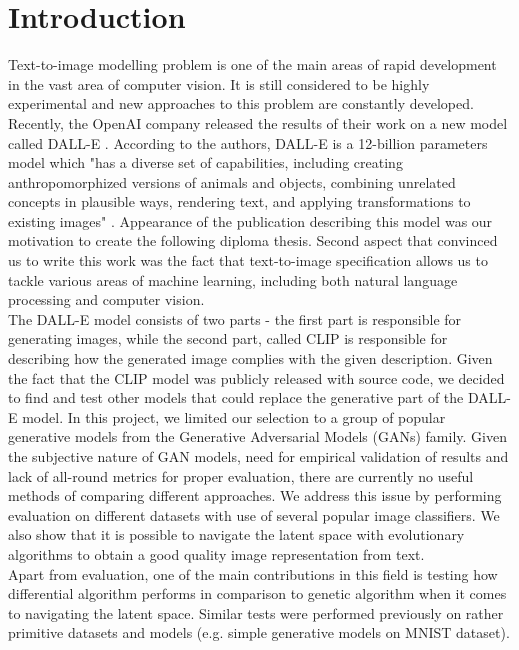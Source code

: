 \documentclass[12pt,a4paper,openany]{book}
\begin{document}


\tableofcontents

\chapter*{Introduction}

\noindent Text-to-image modelling problem is one of the main areas of rapid development in the vast area of computer vision.  It is still considered to be highly experimental and new approaches to this problem are constantly developed. Recently, the OpenAI company released the results of their work on a new model called DALL-E \cite{dalle}.  According to the authors,  DALL-E is a 12-billion parameters model which "has a diverse set of capabilities, including creating anthropomorphized versions of animals and objects, combining unrelated concepts in plausible ways, rendering text, and applying transformations to existing images" \cite{dalle-blog}.  Appearance of the publication describing this model was our motivation to create the following diploma thesis. Second aspect that convinced us to write this work was the fact that text-to-image specification allows us to tackle various areas of machine learning,  including both natural language processing and computer vision. \\
The DALL-E model consists of two parts - the first part is responsible for generating images, while the second part, called CLIP is responsible for describing how the generated image complies with the given description.  Given the fact that the CLIP model was publicly released with source code, we decided to find and test other models that could replace the generative part of the DALL-E model. In this project, we limited our selection to a group of popular generative models from the Generative Adversarial Models (GANs) family.  Given the subjective nature of GAN models, need for empirical validation of results and lack of all-round metrics for proper evaluation, there are currently no useful methods of comparing different approaches. We address this issue by performing evaluation on different datasets with use of several popular image classifiers. We also show that it is possible to navigate the latent space with evolutionary algorithms to obtain a good quality image representation from text.\\
\noindent Apart from evaluation,  one of the main contributions in this field is testing how differential algorithm performs in comparison to genetic algorithm when it comes to navigating the latent space. Similar tests were performed previously on rather primitive datasets and models (e.g.  simple generative models on MNIST dataset). \\
\end{document}
